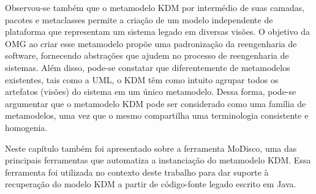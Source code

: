 Observou-se também que o metamodelo KDM por intermédio de suas camadas, pacotes e metaclasses permite a criação de um modelo independente de plataforma que representam um sistema legado em diversas visões. O objetivo da OMG ao criar esse metamodelo propõe uma padronização da reengenharia de software, fornecendo abstrações que ajudem no processo de reengenharia de sistemas. Além disso, pode-se constatar que diferentemente de metamodelos existentes, tais como a UML, o KDM têm como intuito agrupar todos os artefatos (visões) do sistema em um único metamodelo. Dessa forma, pode-se argumentar que o metamodelo KDM pode ser considerado como uma família de metamodelos, uma vez que o mesmo compartilha uma terminologia consistente e homogenia.

Neste capítulo também foi apresentado sobre a ferramenta MoDisco, uma das principais ferramentas que automatiza a instanciação do metamodelo KDM. Essa ferramenta foi utilizada no contexto deste trabalho para dar suporte à recuperação do modelo KDM a partir de código-fonte legado escrito em Java.